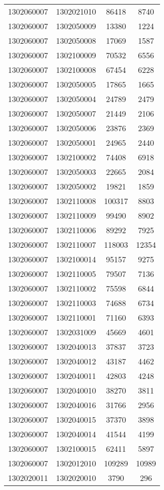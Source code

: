 \begin{longtable}{llcc}
1302060007 & 1302021010 & 86418 & 8740\\
1302060007 & 1302050009 & 13380 & 1224\\
1302060007 & 1302050008 & 17069 & 1587\\
1302060007 & 1302100009 & 70532 & 6556\\
1302060007 & 1302100008 & 67454 & 6228\\
1302060007 & 1302050005 & 17865 & 1665\\
1302060007 & 1302050004 & 24789 & 2479\\
1302060007 & 1302050007 & 21449 & 2106\\
1302060007 & 1302050006 & 23876 & 2369\\
1302060007 & 1302050001 & 24965 & 2440\\
1302060007 & 1302100002 & 74408 & 6918\\
1302060007 & 1302050003 & 22665 & 2084\\
1302060007 & 1302050002 & 19821 & 1859\\
1302060007 & 1302110008 & 100317 & 8803\\
1302060007 & 1302110009 & 99490 & 8902\\
1302060007 & 1302110006 & 89292 & 7925\\
1302060007 & 1302110007 & 118003 & 12354\\
1302060007 & 1302100014 & 95157 & 9275\\
1302060007 & 1302110005 & 79507 & 7136\\
1302060007 & 1302110002 & 75598 & 6844\\
1302060007 & 1302110003 & 74688 & 6734\\
1302060007 & 1302110001 & 71160 & 6393\\
1302060007 & 1302031009 & 45669 & 4601\\
1302060007 & 1302040013 & 37837 & 3723\\
1302060007 & 1302040012 & 43187 & 4462\\
1302060007 & 1302040011 & 42803 & 4248\\
1302060007 & 1302040010 & 38270 & 3811\\
1302060007 & 1302040016 & 31766 & 2956\\
1302060007 & 1302040015 & 37370 & 3898\\
1302060007 & 1302040014 & 41544 & 4199\\
1302060007 & 1302100015 & 62411 & 5897\\
1302060007 & 1302012010 & 109289 & 10989\\
1302020011 & 1302020010 & 3790 & 296\\

\end{longtable}
